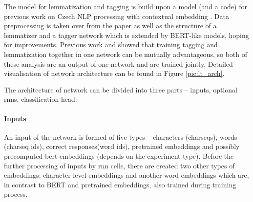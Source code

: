 




The model for lemmatization and tagging is build upon a model (and a code) for previous work on Czech NLP processing with contextual embedding \citep{straka2019czech}. 
Data preprocessing is taken over from the paper as well as the structure of a lemmatizer and a tagger network which is extended by BERT-like models, hoping for improvements. Previous work \citep{Straka2019} and \citep{Straka2018} showed that training tagging and lemmatization together in one network can be mutually advantageous, so both of these analysis are an output of one network and are trained jointly. Detailed visualisation of network architecture can be found in Figure \ref{pic:lt_arch}. \par The architecture of network can be divided into three parts -- inputs, optional \acrshort{rnn}s, classification head:
\paragraph{Inputs}
An input of the network is formed of five types -- characters (charseqs), words (charseq ids), correct responses(word ids), pretrained embeddings and possibly precomputed bert embeddings (depends on the experiment type). Before the further processing of inputs by \acrshort{rnn} cells, there are created two other types of embeddings: character-level embeddings and another word embeddings which are, in contrast to BERT and pretrained embeddings, also trained during training process.

